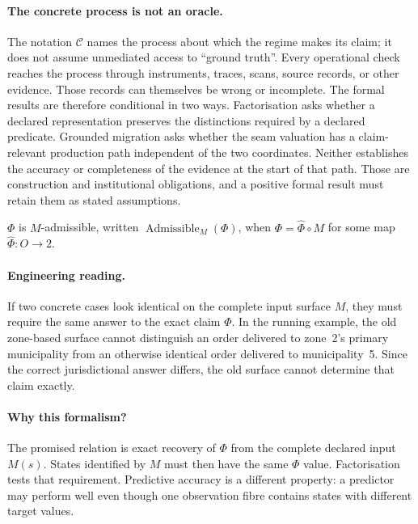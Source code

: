 \documentclass[smallextended,envcountsect,envcountsame,natbib]{svjour3}
\begin{document}
\paragraph{The concrete process is not an oracle.} The notation $\mathcal{C}$ names the process about which the regime makes its claim; it does not assume unmediated access to ``ground truth''. Every operational check reaches the process through instruments, traces, scans, source records, or other evidence. Those records can themselves be wrong or incomplete. The formal results are therefore conditional in two ways. Factorisation asks whether a declared representation preserves the distinctions required by a declared predicate. Grounded migration asks whether the seam valuation has a claim-relevant production path independent of the two coordinates. Neither establishes the accuracy or completeness of the evidence at the start of that path. Those are construction and institutional obligations, and a positive formal result must retain them as stated assumptions.

\begin{definition}\label{ex:def:admissible}
$\Phi$ is $M$-admissible, written $\operatorname{Admissible}_M(\Phi)$, when $\Phi=\widehat\Phi \circ M$ for some map $\widehat\Phi:O\to 2$.
\end{definition}

\paragraph{Engineering reading.} If two concrete cases look identical on the complete input surface $M$, they must require the same answer to the exact claim $\Phi$. In the running example, the old zone-based surface cannot distinguish an order delivered to zone~2's primary municipality from an otherwise identical order delivered to municipality~5. Since the correct jurisdictional answer differs, the old surface cannot determine that claim exactly.

\paragraph{Why this formalism?} The promised relation is exact recovery of $\Phi$ from the complete declared input $M(s)$. States identified by $M$ must then have the same $\Phi$ value. Factorisation tests that requirement. Predictive accuracy is a different property: a predictor may perform well even though one observation fibre contains states with different target values.
\end{document}
